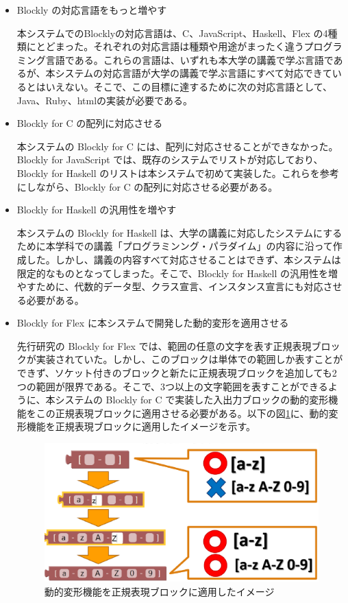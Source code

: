 \documentclass{eniepaper}
\begin{document}
\begin{itemize}

\item Blockly の対応言語をもっと増やす

本システムでのBlocklyの対応言語は、C、JavaScript、Haskell、Flex の4種類にとどまった。それぞれの対応言語は種類や用途がまったく違うプログラミング言語である。これらの言語は、いずれも本大学の講義で学ぶ言語であるが、本システムの対応言語が大学の講義で学ぶ言語にすべて対応できているとはいえない。そこで、この目標に達するために次の対応言語として、Java、Ruby、htmlの実装が必要である。

\item Blockly for C の配列に対応させる

本システムの Blockly for C には、配列に対応させることができなかった。Blockly for JavaScript では、既存のシステムでリストが対応しており、Blockly for Haskell のリストは本システムで初めて実装した。これらを参考にしながら、Blockly for C の配列に対応させる必要がある。

\item Blockly for Haskell の汎用性を増やす

本システムの Blockly for Haskell は、大学の講義に対応したシステムにするために本学科での講義「プログラミンング・パラダイム」の内容に沿って作成した。しかし、講義の内容すべて対応させることはできず、本システムは限定的なものとなってしまった。そこで、Blockly for Haskell の汎用性を増やすために、代数的データ型、クラス宣言、インスタンス宣言にも対応させる必要がある。

\item Blockly for Flex に本システムで開発した動的変形を適用させる

先行研究の Blockly for Flex では、範囲の任意の文字を表す正規表現ブロックが実装されていた。しかし、このブロックは単体での範囲しか表すことができず、ソケット付きのブロックと新たに正規表現ブロックを追加しても2つの範囲が限界である。そこで、3つ以上の文字範囲を表すことができるように、本システムの Blockly for C で実装した入出力ブロックの動的変形機能をこの正規表現ブロックに適用させる必要がある。以下の図\ref{fig:flex_dynamic_deformation}に、動的変形機能を正規表現ブロックに適用したイメージを示す。

\begin{figure}[h]
\begin{center}
\includegraphics[scale=0.5]{img/flex_dynamic_deformation.eps}
\caption{動的変形機能を正規表現ブロックに適用したイメージ}%
\label{fig:flex_dynamic_deformation}
\end{center}%
\end{figure}%


\end{itemize}
\end{document}
